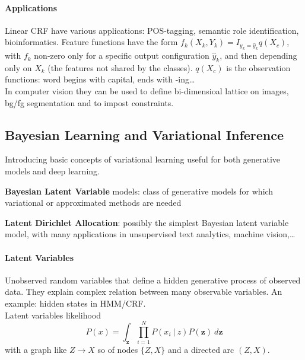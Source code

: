 \documentclass[10pt]{report}
\begin{document}
\paragraph{Applications} Linear CRF have various applications: POS-tagging, semantic role identification, bioinformatics. Feature functions have the form $f_k(X_k,Y_k)=I_{y_k=\hat{y}_k}q(X_c)$, with $f_k$ non-zero only for a specific output configuration $\hat{y}_k$, and then depending only on $X_k$ (the features not shared by the classes). $q(X_c)$ is the observation functions: word begins with capital, ends with -ing\ldots\\
In computer vision they can be used to define bi-dimensioal lattice on images, bg/fg segmentation and to impost constraints.

\subsection{Bayesian Learning and Variational Inference}
Introducing basic concepts of variational learning useful for both generative models and deep learning.
\begin{list}{}{}
	\item \textbf{Bayesian Latent Variable} models: class of generative models for which variational or approximated methods are needed
	\item \textbf{Latent Dirichlet Allocation}: possibly the simplest Bayesian latent variable model, with many applications in unsupervised text analytics, machine vision,\ldots
\end{list}
\paragraph{Latent Variables} Unobserved random variables that define a hidden generative process of observed data. They explain complex relation between many observable variables. An example: hidden states in HMM/CRF.\\
Latent variables likelihood $$P(x) = \int_\mathbf{z} \prod_{i=1}^N P(x_i\:|\:z)P(\mathbf{z})\:d\mathbf{z}$$ with a graph like $Z \longrightarrow X$ so of nodes $\{Z,X\}$ and a directed arc $(Z,X)$.
\end{document}
